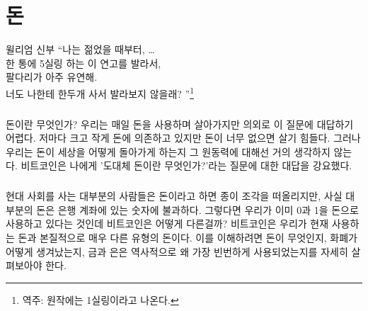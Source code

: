 \chapter{돈}
\label{les:11}

\begin{chapquote}{윌리엄 신부}
	\enquote{나는 젊었을 때부터, \ldots \\
		한 통에 5실링 하는 이 연고를 발라서, \\
		팔다리가 아주 유연해. \\
		너도 나한테 한두개 사서 발라보지 않을래?
	}\footnote{역주: 원작에는 1실링이라고 나온다.}
\end{chapquote}



\paragraph{}
돈이란 무엇인가? 
우리는 매일 돈을 사용하며 살아가지만 의외로 이 질문에 대답하기 어렵다. 
저마다 크고 작게 돈에 의존하고 있지만 돈이 너무 없으면 살기 힘들다.
그러나 우리는 돈이 세상을 어떻게 돌아가게 하는지 그 원동력에 대해선 거의 생각하지 않는다.
비트코인은 나에게 '도대체 돈이란 무엇인가?'라는 질문에 대한 대답을 강요했다.



\paragraph{}
현대 사회를 사는 대부분의 사람들은 돈이라고 하면 종이 조각을 떠올리지만, 사실 대부분의 돈은 은행 계좌에 있는 숫자에 불과하다.
그렇다면 우리가 이미 0과 1을 돈으로 사용하고 있다는 것인데 비트코인은 어떻게 다른걸까? 
비트코인은 우리가 현재 사용하는 돈과 본질적으로 매우 다른 유형의 돈이다. 
이를 이해하려면 돈이 무엇인지, 화폐가 어떻게 생겨났는지, 
금과 은은 역사적으로 왜 가장 빈번하게 사용되었는지를 자세히 살펴보아야 한다.

